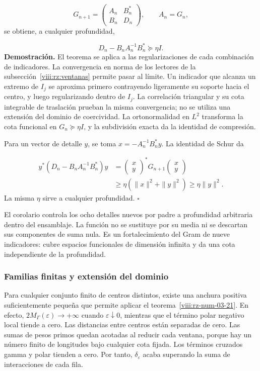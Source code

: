 \[
G_{n+1}=\begin{pmatrix}A_n&B_n^*\\B_n&D_n\end{pmatrix},
\qquad A_n=G_n,
\]
se obtiene, a cualquier profundidad,

\[
\boxed{D_n-B_nA_n^{-1}B_n^*\succeq\eta I.}
\]
\textbf{Demostración.} El teorema se aplica a las regularizaciones de cada combinación de indicadores. La convergencia en norma de los lectores de la subsección~\ref{viii:rz:ventanas} permite pasar al límite. Un indicador que alcanza un extremo de \(I_j\) se aproxima primero contrayendo ligeramente su soporte hacia el centro, y luego regularizando dentro de \(I_j\). La correlación triangular y su cota integrable de traslación prueban la misma convergencia; no se utiliza una extensión del dominio de coercividad. La ortonormalidad en \(L^2\) transforma la cota funcional en \(G_n\succeq\eta I\), y la subdivisión exacta da la identidad de compresión.

Para un vector de detalle \(y\), se toma \(x=-A_n^{-1}B_n^*y\). La identidad de Schur da

\[
\begin{aligned}
y^*(D_n-B_nA_n^{-1}B_n^*)y
&=\begin{pmatrix}x\\y\end{pmatrix}^*G_{n+1}
\begin{pmatrix}x\\y\end{pmatrix}\\
&\geq\eta(\|x\|^2+\|y\|^2)\geq\eta\|y\|^2.
\end{aligned}
\]
La misma \(\eta\) sirve a cualquier profundidad. \hfill\(\square\)

El corolario controla los ocho detalles nuevos por padre a profundidad arbitraria dentro del ensamblaje. La función no se sustituye por su media ni se descartan sus componentes de suma nula. Es un fortalecimiento del Gram de nueve indicadores: cubre espacios funcionales de dimensión infinita y da una cota independiente de la profundidad.

\subsubsection*{Familias finitas y extensión del dominio}
Para cualquier conjunto finito de centros distintos, existe una anchura positiva suficientemente pequeña que permite aplicar el teorema~\ref{viii:rz-num-03-21}. En efecto, \(2M_\Gamma(\varepsilon)\to+\infty\) cuando \(\varepsilon\downarrow0\), mientras que el término polar negativo local tiende a cero. Las distancias entre centros están separadas de cero. Las sumas de pesos primos quedan acotadas al reducir cada ventana, porque hay un número finito de longitudes bajo cualquier cota fijada. Los términos cruzados gamma y polar tienden a cero. Por tanto, \(\delta_\varepsilon\) acaba superando la suma de interacciones de cada fila.

